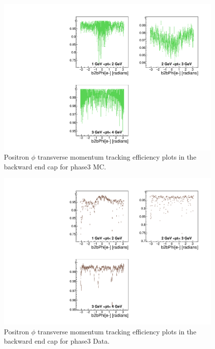 \documentclass[a4paper,11pt,twosided,final,german,openbib,pdftex,listof=totoc,bibliography=totoc]{scrbook}
\begin{document}
\begin{appendix}


\clearpage







\begin{figure}[!htbp]
	\centering
	\includegraphics[width=\textwidth]{Plots/master3/xPtMPhiepEC_MCP3}
	\caption[Transverse Momentum $\phi$ Positron Backward End Cap Efficiency Phase3 MC]{Positron $\phi$ transverse momentum tracking efficiency plots in the backward end cap for phase3 MC.}
	\label{plt:PtMPhiepEC3_MC}
\end{figure}


\begin{figure}[!htbp]
	\centering
	\includegraphics[width=\textwidth]{Plots/master3/xPtMPhiepEC_DataP3}
	\caption[Transverse Momentum $\phi$ Positron Backward End Cap Efficiency Phase3 Data]{Positron $\phi$ transverse momentum tracking efficiency plots in the backward end cap for phase3 Data.}
	\label{plt:PtMPhiepEC3_Data}
\end{figure}









\end{appendix}
\end{document}
